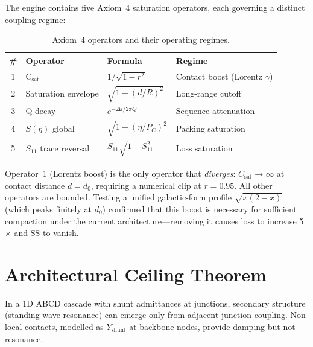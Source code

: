 The engine contains five Axiom~4 saturation operators, each governing a distinct coupling regime:

\begin{table}[H]
\centering
\caption{Axiom~4 operators and their operating regimes.}
\label{tab:saturation_operators}
\begin{tabular}{@{}c l l l@{}}
\toprule
\textbf{\#} & \textbf{Operator} & \textbf{Formula} & \textbf{Regime} \\
\midrule
1 & C$_\text{sat}$               & $1/\sqrt{1-r^2}$               & Contact boost (Lorentz $\gamma$) \\
2 & Saturation envelope           & $\sqrt{1-(d/R)^2}$             & Long-range cutoff \\
3 & Q-decay                       & $e^{-\Delta i / 2\pi Q}$       & Sequence attenuation \\
4 & $S(\eta)$ global              & $\sqrt{1-(\eta/P_C)^2}$        & Packing saturation \\
5 & $S_{11}$ trace reversal       & $S_{11}\sqrt{1-S_{11}^2}$      & Loss saturation \\
\bottomrule
\end{tabular}
\end{table}

\noindent Operator~1 (Lorentz boost) is the only operator that \emph{diverges}: $C_\text{sat} \to \infty$ at contact distance $d = d_0$, requiring a numerical clip at $r = 0.95$.  All other operators are bounded.  Testing a unified galactic-form profile $\sqrt{x(2-x)}$ (which peaks finitely at $d_0$) confirmed that this boost is necessary for sufficient compaction under the current architecture---removing it causes loss to increase 5$\times$ and SS to vanish.

\section{Architectural Ceiling Theorem}
\label{sec:ceiling_theorem}
\label{sec:architectural_ceiling}

\begin{theorem}
In a 1D ABCD cascade with shunt admittances at junctions, secondary structure (standing-wave resonance) can emerge only from adjacent-junction coupling.  Non-local contacts, modelled as $Y_\text{shunt}$ at backbone nodes, provide damping but not resonance.
\end{theorem}

